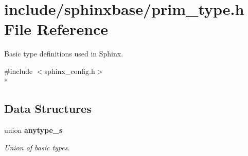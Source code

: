 \section{include/sphinxbase/prim\+\_\+type.h File Reference}
\label{prim__type_8h}


Basic type definitions used in Sphinx.  


{\ttfamily \#include $<$sphinx\+\_\+config.\+h$>$}\\*
\subsection*{Data Structures}
\begin{DoxyCompactItemize}
\item 
union {\bf anytype\+\_\+s}
\begin{DoxyCompactList}\small\item\em Union of basic types. \end{DoxyCompactList}\end{DoxyCompactItemize}
